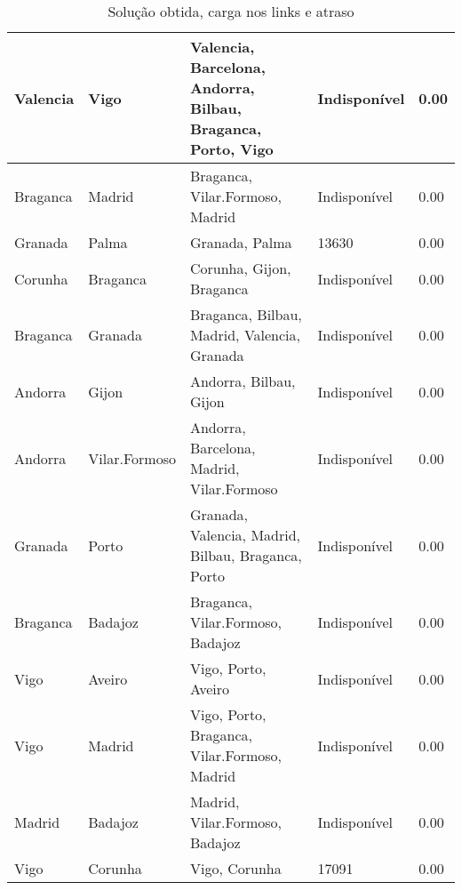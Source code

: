 \begin{table}[!htb]
{\begin{tabular}{|l|l|l|l|l|}
Valencia & Vigo & Valencia, Barcelona, Andorra, Bilbau, Braganca, Porto, Vigo & Indisponível & 0.00 \\ \hline
Braganca & Madrid & Braganca, Vilar.Formoso, Madrid & Indisponível & 0.00 \\ \hline
Granada & Palma & Granada, Palma & 13630 & 0.00 \\ \hline
Corunha & Braganca & Corunha, Gijon, Braganca & Indisponível & 0.00 \\ \hline
Braganca & Granada & Braganca, Bilbau, Madrid, Valencia, Granada & Indisponível & 0.00 \\ \hline
Andorra & Gijon & Andorra, Bilbau, Gijon & Indisponível & 0.00 \\ \hline
Andorra & Vilar.Formoso & Andorra, Barcelona, Madrid, Vilar.Formoso & Indisponível & 0.00 \\ \hline
Granada & Porto & Granada, Valencia, Madrid, Bilbau, Braganca, Porto & Indisponível & 0.00 \\ \hline
Braganca & Badajoz & Braganca, Vilar.Formoso, Badajoz & Indisponível & 0.00 \\ \hline
Vigo & Aveiro & Vigo, Porto, Aveiro & Indisponível & 0.00 \\ \hline
Vigo & Madrid & Vigo, Porto, Braganca, Vilar.Formoso, Madrid & Indisponível & 0.00 \\ \hline
Madrid & Badajoz & Madrid, Vilar.Formoso, Badajoz & Indisponível & 0.00 \\ \hline
Vigo & Corunha & Vigo, Corunha & 17091 & 0.00 \\ \hline
\end{tabular}}
\caption[]{Solução obtida, carga nos links e atraso}
\end{table}

